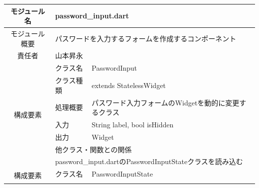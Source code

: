 \begin{table}[H]
  \centering
  \begin{tabular}{|c|l|l|} \hline
    モジュール名                & \multicolumn{2}{l|}{password\_input.dart}                                                                                             \\ \hline
    モジュール概要               & \multicolumn{2}{p{12cm}|}{パスワードを入力するフォームを作成するコンポーネント}                                                                                 \\ \hline
    責任者                   & \multicolumn{2}{l|}{山本昇永}                                                                                                             \\ \hline
    \multirow{7}{*}{構成要素} & クラス名                                                                       & PasswordInput                                            \\ \cline{2-3}
                          & クラス種類                                                                      & extends StatelessWidget                                  \\ \cline{2-3}
                          & 処理概要                                                                       & \multicolumn{1}{p{12cm}|}{パスワード入力フォームのWidgetを動的に変更するクラス} \\ \cline{2-3}
                          & 入力                                                                         & String label, bool isHidden                              \\ \cline{2-3}
                          & 出力                                                                         & Widget                                                   \\ \cline{2-3}
                          & \multicolumn{2}{l|}{他クラス・関数との関係}                                                                                                      \\ \cline{2-3}
                          & \multicolumn{2}{p{14cm}|}{password\_input.dartのPasswordInputStateクラスを読み込む}                                                            \\ \hline
    \multirow{7}{*}{構成要素} & クラス名                                                                       & PasswordInputState                                       \\ \cline{2-3}

\end{tabular}
\end{table}
